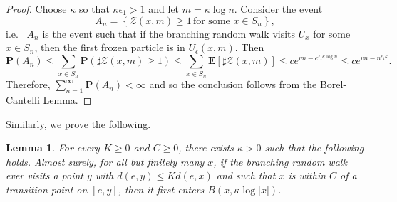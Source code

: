 \documentclass{amsart}
\newtheorem{lem}[thm]{Lemma}
\theoremstyle{definition}
\theoremstyle{remark}
\begin{document}
\begin{proof}

 
Choose $\kappa$ so that $ \kappa \epsilon_1 >1$ and let $m=\kappa \log n$.  Consider the event
$$A_n = \left\{ \mathcal{Z}(x, m) \ge 1 \, \text{for some } x \in S_n \right\},$$ i.e. \ $A_n$ is the   event such that if  the branching random walk visits $U_x$ for some $x\in S_n$, then the first frozen particle is in $U_{\epsilon}(x,m)$.  Then  
$$
\mathbf P(A_n) \le \sum_{x\in S_n}\mathbf P(\sharp  \mathcal Z({x,m})\ge 1) \le\sum_{x\in S_n} \mathbf E[\sharp \mathcal Z({x,m})] \le c e^{vn-e^{\epsilon_1 \kappa\log n}} \le c e^{vn-n^{\epsilon_1\kappa}}. 
$$ 
Therefore,  $\sum_{n=1}^{\infty} \mathbf P(A_n)  <\infty$ and so
the conclusion follows from the Borel-Cantelli Lemma.      
\end{proof}





Similarly, we prove the following.
\begin{lem}\label{TraceAvoidTransBall2}
For every $K\geq 0$ and $C\geq 0$, there exists $\kappa>0$ such that the following holds.
Almost surely, for all but finitely many $x$, if the branching random walk ever visits a point $y$ with $d(e,y)\leq Kd(e,x)$ and such that $x$ is within $C$ of a transition point on $[e,y]$, then it first enters $B(x,\kappa \log |x|)$.
\end{lem}
\end{document}

